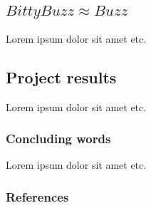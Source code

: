 \documentclass{beamer}
\begin{document}
	\begin{frame}
		\section{$BittyBuzz \approx Buzz$}
		Lorem ipsum dolor sit amet etc.
	\end{frame}
	\begin{frame}
		\section{Project results}
		Lorem ipsum dolor sit amet etc.
	\end{frame}
	\begin{frame}
		\frametitle{Concluding words}
		Lorem ipsum dolor sit amet etc.
	\end{frame}
	\begin{frame}
		\frametitle[allowframebreaks]{References}
		
	\end{frame}
\end{document}

